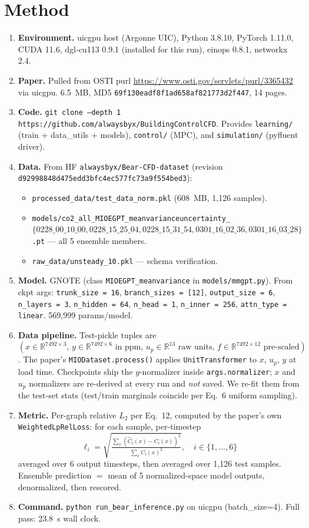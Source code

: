 \documentclass[10pt]{article}
\begin{document}
\section{Method}
\begin{enumerate}
\item \textbf{Environment.} uicgpu host (Argonne UIC), Python 3.8.10, PyTorch 1.11.0, CUDA 11.6, dgl-cu113 0.9.1 (installed for this run), einops 0.8.1, networkx 2.4.
\item \textbf{Paper.} Pulled from OSTI purl \url{https://www.osti.gov/servlets/purl/3365432} via uicgpu. 6.5~MB, MD5 \texttt{69f130eadf8f1ad658af821773d2f447}, 14 pages.
\item \textbf{Code.} \texttt{git clone --depth 1 https://github.com/alwaysbyx/BuildingControlCFD}. Provides \texttt{learning/} (train + data\_utils + models), \texttt{control/} (MPC), and \texttt{simulation/} (pyfluent driver).
\item \textbf{Data.} From HF \texttt{alwaysbyx/Bear-CFD-dataset} (revision \texttt{d92998848d475edd3bfc4ec577fc73a9f554bed3}):
  \begin{itemize}
  \item \texttt{processed\_data/test\_data\_norm.pkl} (608~MB, 1{,}126 samples).
  \item \texttt{models/co2\_all\_MIOEGPT\_meanvarianceuncertainty\_$\{0228\_00\_10\_00, 0228\_15\_25\_04, 0228\_15\_31\_54, 0301\_16\_02\_36, 0301\_16\_03\_28\}$.pt} — all 5 ensemble members.
  \item \texttt{raw\_data/unsteady\_10.pkl} — schema verification.
  \end{itemize}
\item \textbf{Model.} GNOTE (class \texttt{MIOEGPT\_meanvariance} in \texttt{models/mmgpt.py}). From ckpt args: \texttt{trunk\_size = 16}, \texttt{branch\_sizes = [12]}, \texttt{output\_size = 6}, \texttt{n\_layers = 3}, \texttt{n\_hidden = 64}, \texttt{n\_head = 1}, \texttt{n\_inner = 256}, \texttt{attn\_type = linear}. 569{,}999 params/model.
\item \textbf{Data pipeline.} Test-pickle tuples are $(x{\in}\mathbb{R}^{7492\times3},\, y{\in}\mathbb{R}^{7492\times6}\text{ in ppm},\, u_p{\in}\mathbb{R}^{13}\text{ raw units},\, f{\in}\mathbb{R}^{7492\times12}\text{ pre-scaled})$. The paper's \texttt{MIODataset.process()} applies \texttt{UnitTransformer} to $x$, $u_p$, $y$ at load time. Checkpoints ship the $y$-normalizer inside \texttt{args.normalizer}; $x$ and $u_p$ normalizers are re-derived at every run and \emph{not} saved. We re-fit them from the test-set stats (test/train marginals coincide per Eq.~6 uniform sampling).
\item \textbf{Metric.} Per-graph relative $L_2$ per Eq.~12, computed by the paper's own \texttt{WeightedLpRelLoss}: for each sample, per-timestep
\[
\ell_i = \sqrt{\tfrac{\sum_x (\hat C_i(x) - C_i(x))^2}{\sum_x C_i(x)^2}}, \quad i \in \{1,\dots,6\}
\]
averaged over 6 output timesteps, then averaged over 1{,}126 test samples. Ensemble prediction $=$ mean of 5 normalized-space model outputs, denormalized, then rescored.
\item \textbf{Command.} \texttt{python run\_bear\_inference.py} on uicgpu (batch\_size=4). Full pass: 23.8~s wall clock.
\end{enumerate}
\end{document}
